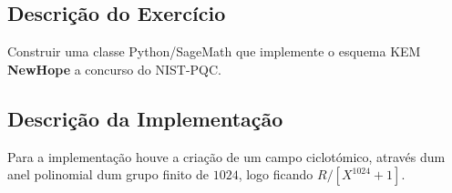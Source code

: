 \documentclass[12pt]{report}
\begin{document}
\subsection{Descrição do
Exercício}\label{descriuxe7uxe3o-do-exercuxedcio}
\vspace{2mm}
Construir uma classe Python/SageMath que implemente o esquema KEM
\textbf{NewHope} a concurso do NIST-PQC.
\vspace{2mm}
\subsection{Descrição da
Implementação}\label{descriuxe7uxe3o-da-implementauxe7uxe3o}
\vspace{2mm}
Para a implementação houve a criação de um campo ciclotómico, através
dum anel polinomial dum grupo finito de \(1024\), logo ficando
\(R/[X^1024+1]\).
\vspace{2mm}
\end{document}
